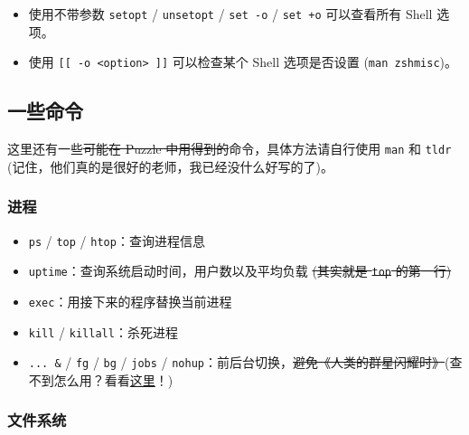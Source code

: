 \documentclass{article}
\begin{document}
	\begin{itemize}
		\itemsep0pt
		\item 使用不带参数 \texttt{setopt} / \texttt{unsetopt} / \texttt{set -o} / \texttt{set +o} 可以查看所有 Shell 选项。
		\item 使用 \texttt{[[ -o <option> ]]} 可以检查某个 Shell 选项是否设置 (\texttt{man zshmisc})。
	\end{itemize}

	\subsection{一些命令}

	这里还有一些\sout{可能在 Puzzle 中用得到的}命令，具体方法请自行使用 \texttt{man} 和 \texttt{tldr} (记住，他们真的是很好的老师，我已经没什么好写的了)。

	\subsubsection{进程}

	\begin{itemize}
		\itemsep0pt
		\item \texttt{ps} / \texttt{top} / \texttt{htop}：查询进程信息
		\item \texttt{uptime}：查询系统启动时间，用户数以及平均负载 \sout{(其实就是 \texttt{top} 的第一行)}
		\item \texttt{exec}：用接下来的程序替换当前进程
		\item \texttt{kill} / \texttt{killall}：杀死进程
		\item \texttt{... \&} / \texttt{fg} / \texttt{bg} / \texttt{jobs} / \texttt{nohup}：前后台切换，\sout{避免《人类的群星闪耀时》}(查不到怎么用？看看\hyperref[item:docbuiltin]{这里}！)
	\end{itemize}

	\subsubsection{文件系统}
\end{document}
